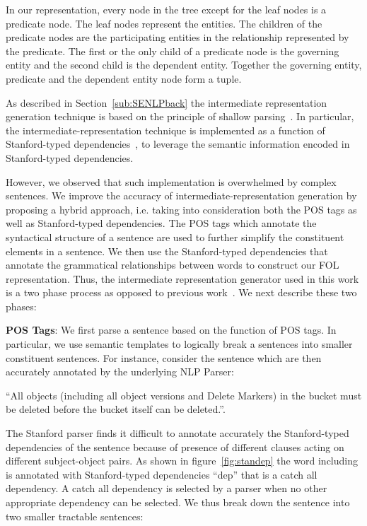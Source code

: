In our representation, every node in the tree except for the leaf nodes is a predicate node. 
The leaf nodes represent the entities.
The children of the predicate nodes are the participating entities in the relationship represented by the predicate.
The first or the only child of a predicate node is the governing entity and the second child is the dependent entity.
Together the governing entity, predicate and the dependent entity node form a tuple.  


As described in Section~\ref{sub:SENLPback} the intermediate representation generation technique is based on the principle of shallow parsing~\cite{Branimir2000}. 
In particular, the intermediate-representation technique is implemented as a function of Stanford-typed dependencies~\cite{Marneffe06LREC,Marneffe08COLING,KleinNIPS03}, to leverage the semantic information encoded in Stanford-typed dependencies.


However, we observed that such implementation is overwhelmed by complex sentences.
We improve the accuracy of intermediate-representation generation by proposing a hybrid approach, i.e. taking into consideration both the POS tags as well as Stanford-typed dependencies.
The POS tags which annotate the syntactical structure of a sentence are used to further simplify the constituent elements in a sentence. 
We then use the Stanford-typed dependencies that annotate the grammatical relationships between words to construct our FOL representation.
Thus, the intermediate representation generator used in this work is a two phase process as opposed to previous work~\cite{pandita12:inferring, pandita13:WHYPER}. 
We next describe these two phases:

\textbf{POS Tags}: We first parse a sentence based on the function of POS tags. 
In particular, we use semantic templates to logically break a sentences into smaller constituent sentences. 
For instance, consider the sentence which are then accurately annotated by the underlying NLP Parser:

\begin{center}
\scriptsize``All objects (including all object versions and Delete Markers) in the bucket must be deleted before the bucket itself can be deleted.''. \normalsize
\end{center}

The Stanford parser finds it difficult to annotate accurately the Stanford-typed dependencies of the sentence because of presence of different clauses acting on different subject-object pairs.
As shown in figure~\ref{fig:standep} the word including is annotated with Stanford-typed dependencies ``dep'' that is a catch all dependency. A catch all dependency is selected by a parser when no other appropriate dependency can be selected. We thus break down the sentence into two smaller tractable sentences:

